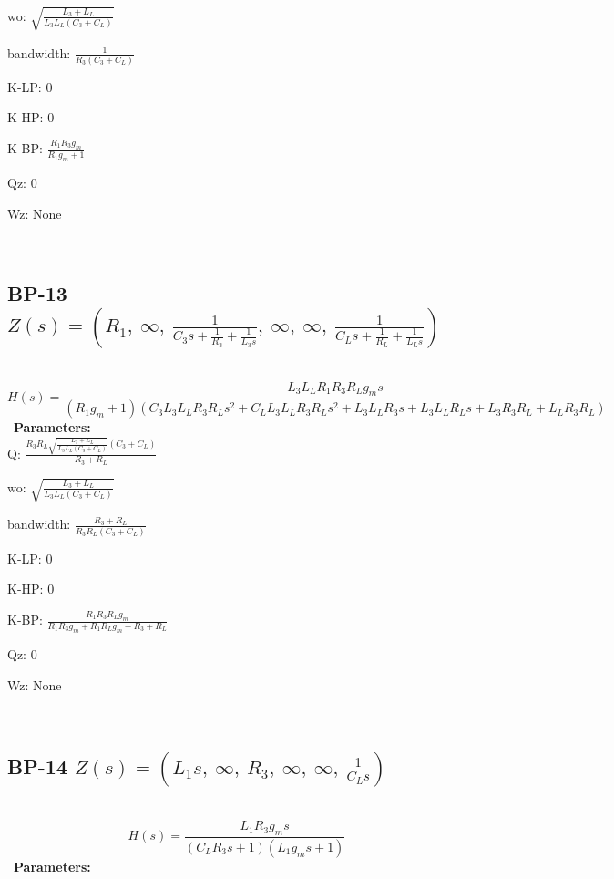 \documentclass{article}
\begin{document}
wo: $\sqrt{\frac{L_{3} + L_{L}}{L_{3} L_{L} \left(C_{3} + C_{L}\right)}}$\ 

bandwidth: $\frac{1}{R_{3} \left(C_{3} + C_{L}\right)}$\ 

K-LP: $0$\ 

K-HP: $0$\ 

K-BP: $\frac{R_{1} R_{3} g_{m}}{R_{1} g_{m} + 1}$\ 

Qz: $0$\ 

Wz: $\text{None}$\ 

\ 

\subsection{BP-13 $Z(s) = \left( R_{1}, \  \infty, \  \frac{1}{C_{3} s + \frac{1}{R_{3}} + \frac{1}{L_{3} s}}, \  \infty, \  \infty, \  \frac{1}{C_{L} s + \frac{1}{R_{L}} + \frac{1}{L_{L} s}}\right)$ } \ 
\textbf{\[H(s) = \frac{L_{3} L_{L} R_{1} R_{3} R_{L} g_{m} s}{\left(R_{1} g_{m} + 1\right) \left(C_{3} L_{3} L_{L} R_{3} R_{L} s^{2} + C_{L} L_{3} L_{L} R_{3} R_{L} s^{2} + L_{3} L_{L} R_{3} s + L_{3} L_{L} R_{L} s + L_{3} R_{3} R_{L} + L_{L} R_{3} R_{L}\right)}\] } \ 
\textbf{Parameters:}\\ 

Q: $\frac{R_{3} R_{L} \sqrt{\frac{L_{3} + L_{L}}{L_{3} L_{L} \left(C_{3} + C_{L}\right)}} \left(C_{3} + C_{L}\right)}{R_{3} + R_{L}}$\ 

wo: $\sqrt{\frac{L_{3} + L_{L}}{L_{3} L_{L} \left(C_{3} + C_{L}\right)}}$\ 

bandwidth: $\frac{R_{3} + R_{L}}{R_{3} R_{L} \left(C_{3} + C_{L}\right)}$\ 

K-LP: $0$\ 

K-HP: $0$\ 

K-BP: $\frac{R_{1} R_{3} R_{L} g_{m}}{R_{1} R_{3} g_{m} + R_{1} R_{L} g_{m} + R_{3} + R_{L}}$\ 

Qz: $0$\ 

Wz: $\text{None}$\ 

\ 

\subsection{BP-14 $Z(s) = \left( L_{1} s, \  \infty, \  R_{3}, \  \infty, \  \infty, \  \frac{1}{C_{L} s}\right)$ } \ 
\textbf{\[H(s) = \frac{L_{1} R_{3} g_{m} s}{\left(C_{L} R_{3} s + 1\right) \left(L_{1} g_{m} s + 1\right)}\] } \ 
\textbf{Parameters:}\\ 
\end{document}
